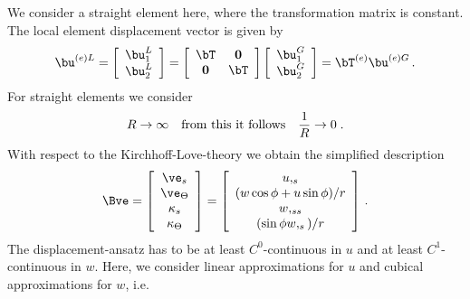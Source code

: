 We consider a straight element here, where the 
transformation matrix is constant. 
The local element displacement vector is given by 
\begin{equation}
\bu^{(e)L}= 
\left[ 
\begin{array}{c}
\bu_1^L \\ \bu_2^L 
\end{array}
\right] = \left[ 
\begin{array}{cc}
\bT & {\bf 0} \\ {\bf 0} & \bT
\end{array}
\right]
\left[
\begin{array}{c}
\bu_1^G \\ \bu_2^G 
\end{array}
\right] = \bT^{(e)} \bu^{(e)G} \, .
\end{equation}
For straight elements we consider 
\begin{equation}
R \rightarrow \infty \quad \textnormal{from this it follows} \quad 
\frac{1}{R} \rightarrow 0 \; .
\end{equation}
With respect to the Kirchhoff-Love-theory we obtain the 
simplified description
\begin{equation}
\Bve = 
\left[ 
\begin{array}{c}
\ve_s \\ \ve_\Theta \\ \kappa_s \\ \kappa_\Theta
\end{array}
\right] = \left[ 
\begin{array}{c}
u,_s \\
(w \cos \phi + u \sin \phi)/r \\
  w,_{ss} \\
(\sin \phi w,_s )/r
\end{array}
\right] \, . 
\label{eq:epsfem}
\end{equation}
The displacement-ansatz has to be at least $C^0$-continuous 
in $u$ and at least $C^1$-continuous in $w$. 
Here, we consider linear approximations for $u$ and cubical 
approximations for $w$, i.e. 
